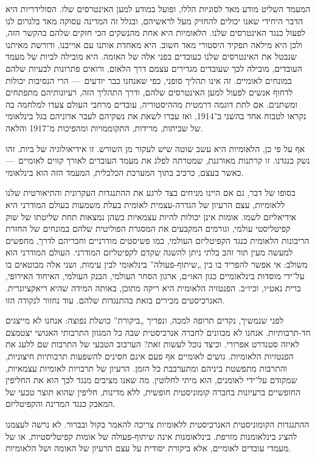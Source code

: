 המעמד השליט מודע מאד לסוגיות הללו, ופועל במודע למען האינטרסים שלו. הסולידריות היא הדבר היחידי שאנו יכולים להחזיק מעל לראשיהם, ובגלל זה המדינה עסוקה מאד בלגרום לנו לפעול כנגד האינטרסים שלנו. הלאומיות היא אחת מהנשקים הכי חזקים שלהם בהקשר הזה, ולכן היא מילאה תפקיד היסטורי מאד חשוב. היא מאחדת אותנו עם אוייבנו, ודורשת מאיתנו שנבטל את האינטרסים שלנו כעובדים בפני אלה של האומה. היא מובילה לביות של מעמד העובדים, מובילה לכך שעובדים מגדירים עצמם דרך הלאום, ורואים פתרונות לבעיות שלהם במונחים לאומיים. זה אינו תהליך סופני, כפי שאנחנו כבר יודעים~— הרי הנסיבות יכולות לדחוף אנשים לפעול למען האינטרסים שלהם, ודרך התהליך הזה, רעיונותיהם מתפתחים ומשתנים. אם לתת דוגמה דרמטית מההיסטוריה, עובדים מרחבי העולם צעדו למלחמה בה נקראו לטבוח אחד בהשני ב־1914, ואז עברו לשאת את נשקיהם לעבר אדוניהם בגל בינלאומי של שביתות, מרידות, התקוממויות ומהפיכות מ־1917 והלאה.

אף על פי כן, הלאומיות היא עשב שוטה שיש לעקור מן השורש. זו אידיאולוגיה של ביות. זהו נשק כנגדנו. זו קרתנות מאורגנת, שמטרתה לפלג את מעמד העובדים לאורך קווים לאומיים~— כאשר בעצם, כרכיב בתוך המערכת הכלכלית, המעמד הזה הוא בינלאומי.

בסופו של דבר, גם אם היינו מניחים בצד לרגע את ההתנגדות העקרונית והתיאורטית שלנו ללאומיות, עצם הרעיון של הגדרה-עצמית לאומית בעלת משמעות בעולם המודרני היא אידיאליזם לשמו. אומות אינן יכולות להיות עצמאיות כשהן נמצאות תחת שליטתו של שוק קפיטליסטי עולמי, וגורמים המקבעים את המסגרת הפוליטית שלהם במונחים של החזרת הריבונות הלאומית כנגד הקפיטליזם העולמי, כמו פשיסטים מודרניים וחבריהם לדרך, מחפשים למעשה מעין תור זהב בלתי ניתן להשגה שקדם לקפיטליזם המודרני. העולם המודרני הוא משולב: אי אפשר להפריד בו בין „שיתוף-פעולה” בינלאומי לבין עימות, ושני אלה מבוטאים בו על־ידי מוסדות בינלאומיים כגון האו״ם, ארגון הסחר העולמי, הבנק העולמי, האיחוד האירופי, ברית נאט״ו, וכיו״ב. הפנטזיה הלאומית היא ריקה מתוכן, באותה המידה שהיא ריאקציונרית. האנרכיסטים מכירים בזאת בהתנגדות שלהם. עוד נחזור לנקודה הזו.

לפני שנמשיך, נקדים תרופה למכה, ונפריך „ביקורת” כושלת נפוצה: אנחנו לא מייצגים חד-תרבותיות. אנחנו לא מכוונים לחברה אנרכיסטית שבה כל המגוון התרבותי האנושי יצטמצם לאיזה סטנדרט אפרורי. וכיצד נוכל לעשות זאת? הערבוב הטבעי של התרבות שם ללעג את הפנטזיות הלאומיות. גושים לאומיים אף פעם אינם חסינים להשפעות תרבותיות חיצוניות, והתרבות מתפשטת ביניהם ומתערבבת כל הזמן. הרעיון של תרבויות לאומיות עצמאיות, שמקודם על־ידי לאומנים, הוא מיתי לחלוטין. מה שאנו מציבים מנגד לכך הוא את החליפין החופשיים ברעיונות בחברה קומוניסטית חופשית, ללא מדינות, חליפין שהוא תוצר טבעי של המאבק כנגד המדינה והקפיטליזם.

ההתנגדות הקומוניסטית האנרכיסטית ללאומיות צריכה להאמר בקול ובברור. לא נרשה לעצמנו להציג בינלאומנות מזויפת. בינלאומנות אינה שיתוף-פעולה של אומות קפיטליסטיות, או של מעמדי עובדים לאומיים, אלא ביקורת יסודית על עצם הרעיון של האומה ושל הלאומיות.



